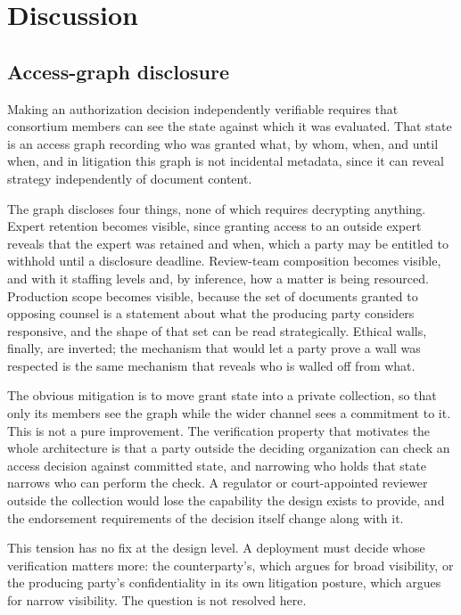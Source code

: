 \documentclass[preprint,12pt]{elsarticle}
\begin{document}
\section{Discussion}
\label{sec:discussion}

\subsection{Access-graph disclosure}
\label{sec:accessgraph}

Making an authorization decision independently verifiable requires that
consortium members can see the state against which it was evaluated. That
state is an access graph recording who was granted what, by whom, when, and
until when, and in litigation this graph is not incidental metadata, since it
can reveal strategy independently of document content.

The graph discloses four things, none of which requires decrypting anything.
Expert retention becomes visible, since granting access to an outside expert
reveals that the expert was retained and when, which a party may be entitled
to withhold until a disclosure deadline. Review-team composition becomes
visible, and with it staffing levels and, by inference, how a matter is being
resourced. Production scope becomes visible, because the set of documents
granted to opposing counsel is a statement about what the producing party
considers responsive, and the shape of that set can be read strategically.
Ethical walls, finally, are inverted; the mechanism that would let a party
prove a wall was respected is the same mechanism that reveals who is walled
off from what.

The obvious mitigation is to move grant state into a private collection, so
that only its members see the graph while the wider channel sees a commitment
to it. This is not a pure improvement. The verification property that
motivates the whole architecture is that a party outside the deciding
organization can check an access decision against committed state, and
narrowing who holds that state narrows who can perform the check. A regulator
or court-appointed reviewer outside the collection would lose the
capability the design exists to provide, and the endorsement requirements of
the decision itself change along with it.

This tension has no fix at the design level. A deployment must decide whose
verification matters more: the counterparty's,
which argues for broad visibility, or the producing party's confidentiality in
its own litigation posture, which argues for narrow visibility. The question
is not resolved here.
\end{document}
